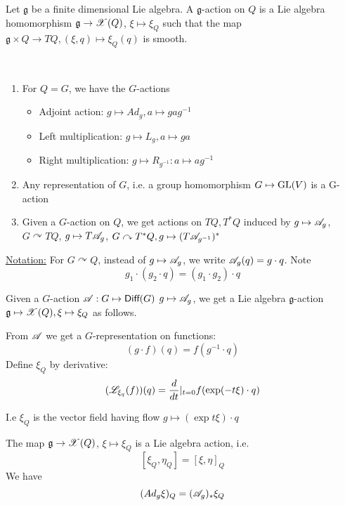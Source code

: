 \documentclass[x11names,reqno,14pt]{extarticle}
\newcommand{\mk}[1]{\mathfrak{#1}}
\newcommand{\g}{\mk{g}}
\newcommand{\dd}[2]{\frac{d#1}{d#2}}
\begin{document}

Let $\g$ be a finite dimensional Lie algebra. A $\g$-action on $Q$ is a Lie algebra homomorphism $\g\to\ms{X}(Q)$, $\xi\mapsto \xi_Q$ such that the map $\g\times Q\to TQ, (\xi,q) \mapsto \xi_Q(q)$ is smooth. 

\exm
\,

\begin{enumerate}

\item For $Q = G$, we have the $G$-actions

\begin{itemize}

\item Adjoint action: $g\mapsto Ad_g, a \mapsto gag^{-1}$

\item Left multiplication: $g \mapsto L_g, a \mapsto ga$

\item Right multiplication: $g\mapsto R_{g^{-1}}: a\mapsto ag^{-1}$

\end{itemize}

\item Any representation of $G$, i.e. a group homomorphism $G \mapsto {\mathrm{GL}}(V)$ is a G-action 

\item Given a $G$-action on $Q$, we get actions on $TQ, T^*Q$ induced by $g \mapsto \mathscr{A}_g$, $G \curvearrowright TQ$, $g\mapsto T\mathscr{A}_g$, $G \curvearrowright T^*Q, g \mapsto (T\mathscr{A}_{g^{-1}})^*$

\end{enumerate}


\underline{Notation:} For $G\curvearrowright Q$, instead of $g\mapsto \mathscr{A}_g$, we write $\mathscr{A}_g(q) = g\cdot q$. Note 
\[
g_1\cdot(g_2\cdot q) = (g_1\cdot g_2)\cdot q
\]



Given a $G$-action $\mathscr{A}:G\mapsto{{\text{\sffamily {Diff}}}}(G)$ $g\mapsto \mathscr{A}_g$, we get a Lie algebra $\g$-action $\g \mapsto \ms{X}(Q),\xi\mapsto\xi_Q$ as follows.

From $\mathscr{A}$ we get a $G$-representation on functions: 
\[
(g\cdot f)(q) = f(g^{-1}\cdot q)
\]
Define $\xi_Q$ by derivative: 
\[
(\ms{L}_{\xi_q}(f))(q) = \dd{}{t}|_{t=0}f(\exp(-t\xi)\cdot q)
\]

I.e $\xi_Q$ is the vector field having flow $g \mapsto (\exp t\xi)\cdot q$

\prop

The map $\g\to \ms{X}(Q)$, $\xi\mapsto \xi_Q$ is a Lie algebra action, i.e. 
\[
[\xi_Q,\eta_Q] = [\xi,\eta]_Q
\]
We have 
\[
(Ad_g\xi)_Q = (\mathscr{A}_g)_*\xi_Q
\]
\end{document}
